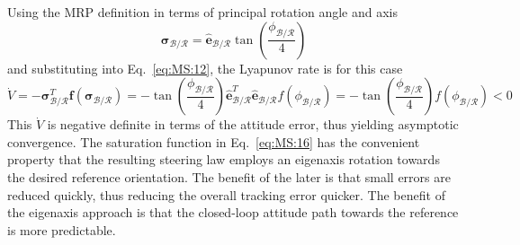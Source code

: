 \documentclass[]{BasiliskReportMemo}
\begin{document}
Using the MRP definition in terms of principal rotation angle and axis
\begin{equation}
	\label{eq:MS:17}
	\bm \sigma_{\mathcal{B}/\mathcal{R}} = \hat{\bm e}_{\mathcal{B}/\mathcal{R}} \tan\left(\frac{\phi_{\mathcal{B}/\mathcal{R}}}{4}\right)
\end{equation}
and substituting into Eq.~\eqref{eq:MS:12}, the Lyapunov rate is for this case
\begin{equation}
	\label{eq:MS:18}
	\dot V =  -  \bm \sigma_{\mathcal{B}/\mathcal{R}}^{T} \bm f(\bm \sigma_{\mathcal{B}/\mathcal{R}})
	= -   \tan\left(\frac{\phi_{\mathcal{B}/\mathcal{R}}}{4}\right) \hat{\bm e}_{\mathcal{B}/\mathcal{R}}^{T} \hat{\bm e}_{\mathcal{B}/\mathcal{R}} f(\phi_{\mathcal{B}/\mathcal{R}})
	= -   \tan\left(\frac{\phi_{\mathcal{B}/\mathcal{R}}}{4}\right)f(\phi_{\mathcal{B}/\mathcal{R}}) < 0
\end{equation}
This $\dot V$ is negative definite in terms of the attitude error, thus yielding asymptotic convergence.  The saturation function in Eq.~\eqref{eq:MS:16} has the convenient property that the resulting steering law employs an eigenaxis rotation towards the desired reference orientation. The benefit of the later is that small errors are reduced quickly, thus reducing the overall tracking error quicker.  The benefit of the eigenaxis approach is that the closed-loop attitude path towards the reference is more predictable.  
\end{document}
